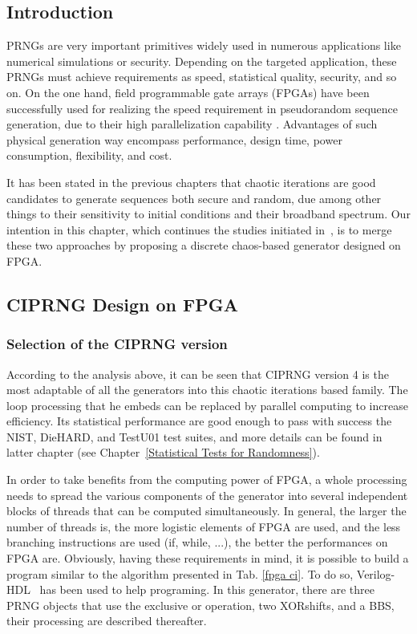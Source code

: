\subsection{Introduction}
PRNGs are very important primitives widely used 
in numerous applications like numerical simulations or security.
Depending on the targeted application, these PRNGs must achieve requirements
as speed, statistical quality, security, and so on. 
On the one hand, field programmable gate arrays (FPGAs) have been successfully used for realizing 
the speed requirement in pseudorandom sequence generation, due to their high parallelization capability \cite{Bojani200663, Danger:2009:HST:1645457.1645933, Tsoi:2003:CFT:938383.938400}. Advantages of such physical generation way encompass performance, design time, power consumption, flexibility, and cost.


It has been stated in the previous chapters that chaotic iterations are
good candidates to generate  sequences both secure and random,
due among other things to
their sensitivity to initial conditions and their broadband spectrum. 
Our intention in this chapter, which continues the studies initiated 
in~\cite{DBLP:journals/corr/abs-1112-5239}, is to merge these two approaches by
proposing a discrete chaos-based generator
designed on FPGA.

\subsection{CIPRNG Design on FPGA}
\label{FPGA design}
\subsubsection{Selection of the CIPRNG version}

According to the analysis above, 
it can be seen that CIPRNG version 4 is the most adaptable of all the generators into
this chaotic iterations based family. 
The loop processing that he embeds can be replaced by parallel computing to increase  efficiency. 
Its statistical performance are good enough to pass with success the NIST, DieHARD, and TestU01 test suites, and more details can be found in latter chapter (see Chapter~\ref{Statistical Tests for Randomness}).

In order to take benefits from the computing power of FPGA, a whole processing
needs to spread the various components of the generator 
into several independent blocks  of threads that can be computed
simultaneously. In general,  the larger the number of  threads is, the
more logistic elements of FPGA are used, and the less branching  instructions are
used  (if,  while,  ...),  the  better the  performances  on  FPGA  are.
Obviously, having these requirements in  mind, it is possible to build
a program similar to the algorithm presented in Tab.
\ref{fpga ci}.  
To do so,  Verilog-HDL~\cite{verilog} has been used to help programing. 
In this generator, there are three
PRNG objects that use the exclusive or operation, two XORshifts, and a BBS, 
their processing are described thereafter.



